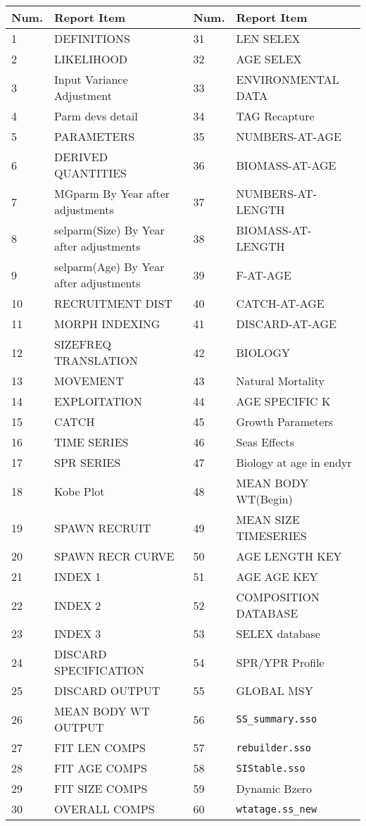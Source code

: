 \begin{center}
	\begin{longtable}{p{1cm} p{6.5cm}p{1cm} p{6cm}}
		\hline
		Num. & Report Item & Num. & Report Item \Tstrut\Bstrut\\
		\hline
1	& DEFINITIONS				    &	31	&	LEN	SELEX \\			
2	& LIKELIHOOD					&	32	&	AGE	SELEX \\			
3	& Input Variance Adjustment	    &	33	&	ENVIRONMENTAL	DATA \\			
4	& Parm devs detail			    &	34	&	TAG	Recapture \\			
5	& PARAMETERS					&	35	&	NUMBERS-AT-AGE \\				
6	& DERIVED	QUANTITIES			&	36	&	BIOMASS-AT-AGE \\				
7	& MGparm By Year after adjustments &	37	& NUMBERS-AT-LENGTH	\\				
8	& selparm(Size) By Year after adjustments & 38 & BIOMASS-AT-LENGTH \\				
9	& selparm(Age) By Year after adjustments  &	39 & F-AT-AGE \\				
10	& RECRUITMENT	DIST			&	40	& CATCH-AT-AGE \\				
11	& MORPH	INDEXING				&	41	& DISCARD-AT-AGE \\				
12	& SIZEFREQ	TRANSLATION			&	42	&	BIOLOGY	\\				
13	& MOVEMENT					    &	43	&	Natural	Mortality \\			
14	& EXPLOITATION					&	44	&	AGE	SPECIFIC	K \\		
15	& CATCH					        &	45	&	Growth	Parameters \\			
16	& TIME	SERIES				    &	46	&	Seas	Effects	\\			
17	& SPR	SERIES				    &	47	&	Biology	at	age	in	endyr \\
18	& Kobe	Plot				    &	48	&	MEAN	BODY	WT(Begin) \\		
19	& SPAWN	RECRUIT				    &	49	&	MEAN	SIZE	TIMESERIES \\		
20	& SPAWN	RECR	CURVE			&	50	&	AGE	LENGTH	KEY	\\		
21	& INDEX	1				        &	51	&	AGE	AGE	KEY	\\		
22	& INDEX	2				        &	52	&	COMPOSITION	DATABASE \\			
23	& INDEX	3				        &	53	&	SELEX	database \\			
24	& DISCARD	SPECIFICATION		&	54	&	SPR/YPR	Profile	\\			
25	& DISCARD	OUTPUT				&	55	&	GLOBAL	MSY	\\			
26	& MEAN	BODY	WT	OUTPUT		&	56	&	\texttt{SS\_summary.sso} \\				
27	& FIT	LEN	COMPS			    &	57	&	\texttt{rebuilder.sso} \\				
28	& FIT	AGE	COMPS			    &	58	&	\texttt{SIStable.sso} \\				
29	& FIT	SIZE	COMPS			&	59	&	Dynamic	Bzero \\			
30	& OVERALL	COMPS				&	60	&	\texttt{wtatage.ss\_new}	\\				
\hline
	\end{longtable}
\end{center}

